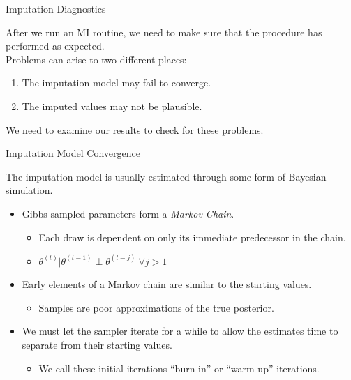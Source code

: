 \documentclass{beamer}\usepackage[]{graphicx}\usepackage[]{color}
\begin{document}
      
\begin{frame}{Imputation Diagnostics}

  After we run an MI routine, we need to make sure that the procedure has 
  performed as expected.\\
  \va
  Problems can arise to two different places:
  \begin{enumerate}
    \item The imputation model may fail to converge.
    \item The imputed values may not be plausible.
  \end{enumerate}
  \va 
  We need to examine our results to check for these problems.
  
\end{frame}


\begin{frame}{Imputation Model Convergence}
  
  The imputation model is usually estimated through some form of Bayesian 
  simulation.
  \vb
  \begin{itemize}
  \item Gibbs sampled parameters form a \emph{Markov Chain}.
    \begin{itemize}
    \item Each draw is dependent on only its immediate predecessor in the chain.
    \item $\theta^{(t)} | \theta^{(t - 1)} \perp \theta^{(t - j)} ~ \forall j > 1$
    \end{itemize}
    \vb
  \item Early elements of a Markov chain are similar to the starting values.
    \begin{itemize}
    \item Samples are poor approximations of the true posterior.
    \end{itemize}
    \vb
  \item We must let the sampler iterate for a while to allow the estimates time 
    to separate from their starting values.
    \begin{itemize}
    \item We call these initial iterations ``burn-in'' or ``warm-up'' 
      iterations.
    \end{itemize}
  \end{itemize}
  
\end{frame}
\end{document}
